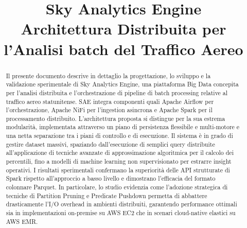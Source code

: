 \documentclass[conference]{IEEEtran}
\begin{document}
\title{Sky Analytics Engine \\ \vspace{0.15cm} \large Architettura Distribuita per l'Analisi batch del Traffico Aereo}

\author{
    \and
}

%

\maketitle
\thispagestyle{headings}


\begin{abstract}
Il presente documento descrive in dettaglio la progettazione, lo sviluppo e la validazione sperimentale di Sky Analytics Engine, una piattaforma Big Data concepita per l'analisi distribuita e l'orchestrazione di pipeline di batch processing relative al traffico aereo statunitense.
SAE integra componenti quali Apache Airflow per l'orchestrazione, Apache NiFi per l'ingestion asincrona e Apache Spark per il processamento distribuito.
L'architettura proposta si distingue per la sua estrema modularità, implementata attraverso un piano di persistenza flessibile e multi-motore e una netta separazione tra i piani di controllo e di esecuzione.
Il sistema è in grado di gestire dataset massivi, spaziando dall'esecuzione di semplici query distribuite all'applicazione di tecniche avanzate di approssimazione algoritmica per il calcolo dei percentili, fino a modelli di machine learning non supervisionato per estrarre insight operativi.
I risultati sperimentali confermano la superiorità delle API strutturate di Spark rispetto all'approccio a basso livello e dimostrano l'efficacia del formato colonnare Parquet.
In particolare, lo studio evidenzia come l'adozione strategica di tecniche di Partition Pruning e Predicate Pushdown permetta di abbattere drasticamente l'I/O overhead in ambienti distribuiti, garantendo performance ottimali sia in implementazioni on-premise su AWS EC2 che in scenari cloud-native elastici su AWS EMR.
\end{abstract}
\end{document}

